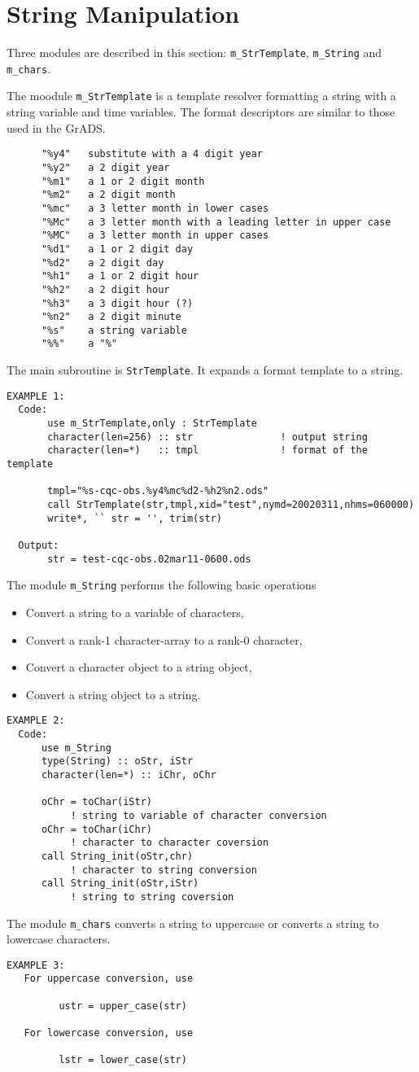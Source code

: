 \section{String Manipulation}
%
Three modules are described in this section: {\tt m\_StrTemplate},
{\tt m\_String} and {\tt m\_chars}.

\noindent
The moodule {\tt m\_StrTemplate} is a template resolver formatting a 
string with a string variable and time variables.  
The format descriptors are similar to those used in the GrADS.
%
\begin{verbatim}
      "%y4"   substitute with a 4 digit year
      "%y2"   a 2 digit year
      "%m1"   a 1 or 2 digit month
      "%m2"   a 2 digit month
      "%mc"   a 3 letter month in lower cases
      "%Mc"   a 3 letter month with a leading letter in upper case
      "%MC"   a 3 letter month in upper cases
      "%d1"   a 1 or 2 digit day
      "%d2"   a 2 digit day
      "%h1"   a 1 or 2 digit hour
      "%h2"   a 2 digit hour
      "%h3"   a 3 digit hour (?)
      "%n2"   a 2 digit minute
      "%s"    a string variable
      "%%"    a "%"
\end{verbatim}
%
The main subroutine is {\tt StrTemplate}. It expands a format template 
to a string.
%
\begin{verbatim}
EXAMPLE 1:
  Code:
       use m_StrTemplate,only : StrTemplate
       character(len=256) :: str               ! output string
       character(len=*)   :: tmpl              ! format of the template
     
       tmpl="%s-cqc-obs.%y4%mc%d2-%h2%n2.ods"
       call StrTemplate(str,tmpl,xid="test",nymd=20020311,nhms=060000)
       write*, `` str = '', trim(str)

  Output:
       str = test-cqc-obs.02mar11-0600.ods
\end{verbatim}

\noindent
The module {\tt m\_String} performs the following basic operations
%
\begin{itemize}
\item Convert a string to a variable of characters,
\item Convert a rank-1 character-array to a rank-0 character,
\item Convert a character object to a string object,
\item Convert a string object to a string.
\end{itemize}
 
\begin{verbatim}
EXAMPLE 2:
  Code:
      use m_String
      type(String) :: oStr, iStr
      character(len=*) :: iChr, oChr

      oChr = toChar(iStr)
           ! string to variable of character conversion
      oChr = toChar(iChr)
           ! character to character coversion
      call String_init(oStr,chr)
           ! character to string conversion
      call String_init(oStr,iStr)  
           ! string to string coversion
\end{verbatim}

\noindent
The module {\tt m\_chars} converts a string to uppercase or converts a string
to lowercase characters.

\begin{verbatim}
EXAMPLE 3:
   For uppercase conversion, use

         ustr = upper_case(str)

   For lowercase conversion, use

         lstr = lower_case(str)
\end{verbatim}
% 
